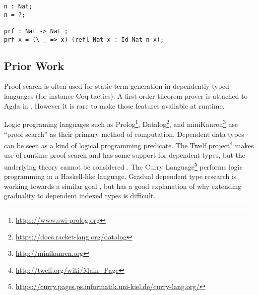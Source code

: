 \begin{lstlisting}[basicstyle={\ttfamily}]
n : Nat;
n = ?;

prf : Nat -> Nat ;
prf x = (\ _ => x) (refl Nat x : Id Nat n x);
\end{lstlisting}


\subsection{Prior Work}

Proof search is often used for static term generation in dependently typed languages (for instance Coq tactics).
A first order theorem prover is attached to Agda in \cite{norell2007towards}.
However it is rare to make those features available at runtime. 

Logic programing languages such as Prolog\footnote{\url{https://www.swi-prolog.org}}, Datalog\footnote{\url{https://docs.racket-lang.org/datalog}}, and miniKanren\footnote{\url{http://minikanren.org}} use ``proof search'' as their primary method of computation.
Dependent data types can be seen as a kind of logical programming predicate.
The Twelf project\footnote{\url{http://twelf.org/wiki/Main\_Page}} makes use of runtime proof search and has some support for dependent types, but the underlying theory cannot be considered \fullSp{}.
The Curry Language\footnote{\url{https://curry.pages.ps.informatik.uni-kiel.de/curry-lang.org/}} performs logic programming in a Haskell-like language.
Gradual dependent type research is working towards a similar goal \cite{10.1145/3341692}, but \cite{10.1145/3495528} has a good explanation of why extending graduality to dependent indexed types is difficult.

